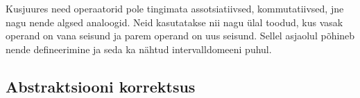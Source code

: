 \documentclass[../thesis.tex]{subfiles}
\begin{document}
Kusjuures need operaatorid pole tingimata assotsiatiivsed, kommutatiivsed, jne nagu nende algsed analoogid. Neid kasutatakse nii nagu ülal toodud, kus vasak operand on vana seisund ja parem operand on uus seisund. Sellel asjaolul põhineb nende defineerimine ja seda ka nähtud intervalldomeeni puhul.

\subsection{Abstraktsiooni korrektsus}
\cite[242]{cousot77}
\end{document}
